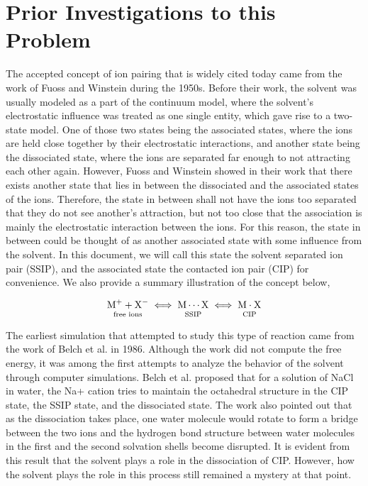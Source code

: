\section{Prior Investigations to this Problem}

\begin{spacing}{2.0}

    The accepted concept of ion pairing that is widely cited today came from the work of Fuoss \cite{P-JACS-1954-v76-Sadek} and Winstein 
    \cite{P-JACS-1956-v78-Winstein} during the 1950s. Before their work, the solvent was usually modeled as a part of the continuum model, where 
    the solvent's electrostatic influence was treated as one single entity, which gave rise to a two-state model. One of those two states being 
    the associated states, where the ions are held close together by their electrostatic interactions, and another state being the dissociated 
    state, where the ions are separated far enough to not attracting each other again. However, Fuoss and Winstein showed in their work that 
    there exists another state that lies in between the dissociated and the associated states of the ions. Therefore, the state in between shall 
    not have the ions too separated that they do not see another's attraction, but not too close that the association is mainly the electrostatic 
    interaction between the ions. For this reason, the state in between could be thought of as another associated state with some influence from 
    the solvent. In this document, we will call this state the solvent separated ion pair (SSIP), and the associated state the contacted ion pair 
    (CIP) for convenience. We also provide a summary illustration of the concept below,

    \begin{equation}
        \underset{\text{free ions}}{\mathrm{M}^+ + \mathrm{X}^-\vphantom{p}} \iff
        \underset{\text{SSIP}}{\mathrm{M} \cdots \mathrm{X}\vphantom{p}} \iff
        \underset{\text{CIP}}{\mathrm{M} \cdot \mathrm{X}\vphantom{p}}
        \label{eq:c1s1-ionpairillus}
    \end{equation} 

    The earliest simulation that attempted to study this type of reaction came from the work of Belch et al. in 1986. \cite{P-JACS-1986-v108-Belch} 
    Although the work did not compute the free energy, it was among the first attempts to analyze the behavior of the solvent through computer 
    simulations. Belch et al. proposed that for a solution of NaCl in water, the Na+ cation tries to maintain the octahedral structure in the CIP 
    state, the SSIP state, and the dissociated state. The work also pointed out that as the dissociation takes place, one water molecule would 
    rotate to form a bridge between the two ions and the hydrogen bond structure between water molecules in the first and the second solvation 
    shells become disrupted. It is evident from this result that the solvent plays a role in the dissociation of CIP. However, how the solvent 
    plays the role in this process still remained a mystery at that point.


\end{spacing}
